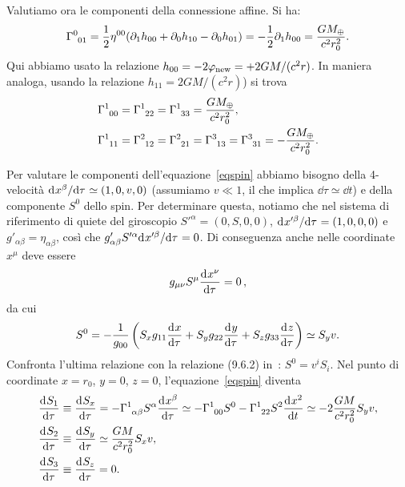 Valutiamo ora le componenti della connessione affine.  Si ha:
\begin{equation}
  \tensor{\Gamma}{^{0}_{01}} =
  \frac{1}{2} \eta^{00} (\partial_1 h_{00} + \partial_0 h_{10}- \partial_0
  h_{01} ) =
  -  \frac{1}{2} \partial_1 h_{00} =   \frac {G M_{\oplus}} {c^2  r_0^2}.
\end{equation}
Qui abbiamo usato la relazione $h_{00}=-2 \phi_{\textup{new}} = + 2GM/(c^2 r)$.
In maniera analoga, usando la relazione $h_{11}=2GM/(c^2 r)$) si trova
\begin{subequations}
  \begin{align}
    \tensor{\Gamma}{^{1}_{00}} &= \tensor{\Gamma}{^{1}_{22}} =
    \tensor{\Gamma}{^{1}_{33}} = \frac{G M_{\oplus}}{c^2 r_0^2}, \\
    \tensor{\Gamma}{^{1}_{11}} &= \tensor{\Gamma}{^{2}_{12}} =
    \tensor{\Gamma}{^{2}_{21}} = \tensor{\Gamma}{^{3}_{13}} =
    \tensor{\Gamma}{^{3}_{31}} = -\frac{G M_{\oplus}}{c^2 r_0^2}.
  \end{align}
\end{subequations}

Per valutare le componenti dell'equazione~\eqref{eqspin} abbiamo bisogno della
4-velocità $\ltoder{x^{\beta}}{\tau} \simeq (1,0,v,0)$ (assumiamo $v\ll 1$, il
che implica $\dd\tau \simeq \dd t$) e della componente $S^0$ dello spin.  Per
determinare questa, notiamo che nel sistema di riferimento di quiete del
giroscopio $S'^{\alpha}=(0,S,0,0)$, $\ltoder{x'^{\beta}}{\tau} = (1,0,0,0)$ e
$g'_{\alpha \beta} = \eta_{\alpha \beta}$, così che $g'_{\alpha \beta}
S'^{\alpha} \ltoder{x'^{\beta}}{\tau} =0$.  Di conseguenza anche nelle
coordinate $x^{\mu}$ deve essere
\begin{equation}
  g_{\mu \nu} S^{\mu} \toder{x^{\nu}}{\tau}=0\,,
\end{equation}
da cui
\begin{equation}
  S^0 = - \frac{1}{g_{00}} \left( S_x g_{11} \toder{x}{\tau} + S_y g_{22}
    \toder{y}{\tau} + S_z g_{33} \toder{z}{\tau}\right) \simeq S_y v.
\end{equation}
Confronta l'ultima relazione con la relazione (9.6.2)
in~\textcite{weinberg:gravitation}: $S^0 = v^i S_i$.  Nel punto di coordinate
$x=r_0$, $y=0$, $z=0$, l'equazione~\eqref{eqspin} diventa
\begin{subequations}
  \begin{align}
    \toder{S_1}{\tau} &\equiv \toder{S_x}{\tau} =
                        -\tensor{\Gamma}{^1_{\alpha \beta}} S^{\alpha}
                        \toder{x^{\beta}}{\tau} \simeq
                        -\tensor{\Gamma}{^1_{00}} S^0  -
                        \tensor{\Gamma}{^1_{22}} S^2 \toder{x^2}{t} \simeq
                        -2 \frac{GM}{c^2 r_0^2} S_y v, \\
    \toder{S_2}{\tau} &\equiv \toder{S_y}{\tau} \simeq \frac{GM}{c^2 r_0^2} S_x
                        v, \\
    \toder{S_3}{\tau} &\equiv \toder{S_z}{\tau} = 0.
  \end{align}
\end{subequations}

